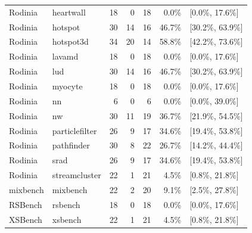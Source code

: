 \begin{table}[t]
\begin{tabular}{@{}llrrrrl@{}}
Rodinia & heartwall & 18 & 0 & 18 & 0.0\% & [0.0\%, 17.6\%] \\
Rodinia & hotspot & 30 & 14 & 16 & 46.7\% & [30.2\%, 63.9\%] \\
Rodinia & hotspot3d & 34 & 20 & 14 & 58.8\% & [42.2\%, 73.6\%] \\
Rodinia & lavamd & 18 & 0 & 18 & 0.0\% & [0.0\%, 17.6\%] \\
Rodinia & lud & 30 & 14 & 16 & 46.7\% & [30.2\%, 63.9\%] \\
Rodinia & myocyte & 18 & 0 & 18 & 0.0\% & [0.0\%, 17.6\%] \\
Rodinia & nn & 6 & 0 & 6 & 0.0\% & [0.0\%, 39.0\%] \\
Rodinia & nw & 30 & 11 & 19 & 36.7\% & [21.9\%, 54.5\%] \\
Rodinia & particlefilter & 26 & 9 & 17 & 34.6\% & [19.4\%, 53.8\%] \\
Rodinia & pathfinder & 30 & 8 & 22 & 26.7\% & [14.2\%, 44.4\%] \\
Rodinia & srad & 26 & 9 & 17 & 34.6\% & [19.4\%, 53.8\%] \\
Rodinia & streamcluster & 22 & 1 & 21 & 4.5\% & [0.8\%, 21.8\%] \\
\midrule
mixbench & mixbench & 22 & 2 & 20 & 9.1\% & [2.5\%, 27.8\%] \\
RSBench & rsbench & 18 & 0 & 18 & 0.0\% & [0.0\%, 17.6\%] \\
XSBench & xsbench & 22 & 1 & 21 & 4.5\% & [0.8\%, 21.8\%] \\
\bottomrule
\end{tabular}
\end{table}

